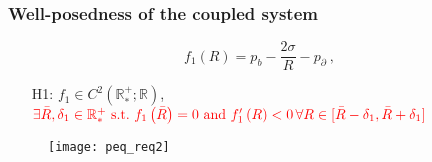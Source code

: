 \documentclass[10pt,aspectratio=169]{beamer}
\begin{document}
\begin{frame}
\frametitle{Well-posedness of the coupled system}\vspace*{0.8cm}
\begin{equation*}
	f_1\left(R\right)=p_b-\frac{2\sigma}{R}-p_\partial~,
\end{equation*}\vspace*{-0.3cm}
\begin{itemize}
	\item[H1:] $f_1\in C^2\left(\mathbb{R}^+_*;\mathbb{R}\right)$, ${\color{red}\exists \bar{R},\delta_1\in\mathbb{R}^+_*~\text{s.t.}~f_1\left(\bar{R}\right)=0~\text{and}~f'_1\left(R\right)<0\, \forall R \in [\bar{R}-\delta_1,\bar{R}+\delta_1]}$
\end{itemize}
	\begin{figure}
	\texttt{[image: peq\_req2]}
\end{figure}
\end{frame} 



\end{document}
